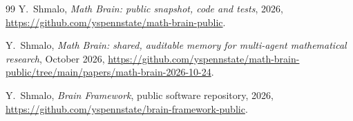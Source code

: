 \documentclass[11pt]{amsart}
\theoremstyle{definition}
\theoremstyle{remark}
\begin{document}
\begin{thebibliography}{99}
 Y.~Shmalo, \emph{Math Brain: public snapshot, code and tests}, 2026, \url{https://github.com/yspennstate/math-brain-public}.

 Y.~Shmalo, \emph{Math Brain: shared, auditable memory for multi-agent mathematical research}, October 2026, \url{https://github.com/yspennstate/math-brain-public/tree/main/papers/math-brain-2026-10-24}.

 Y.~Shmalo, \emph{Brain Framework}, public software repository, 2026, \url{https://github.com/yspennstate/brain-framework-public}.
\end{thebibliography}
\end{document}
